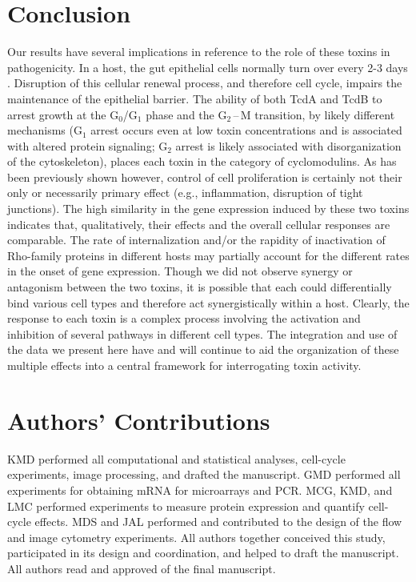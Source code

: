 \section{Conclusion}
Our results have several implications in reference to the role of these toxins in pathogenicity. In a host, the gut epithelial cells normally turn over every 2-3 days \cite{Kim:2010ja}. Disruption of this cellular renewal process, and therefore cell cycle, impairs the maintenance of the epithelial barrier. The ability of both TcdA and TcdB to arrest growth at the G$_{\text{0}}$/G$_{\text{1}}$ phase and the G$_{\text{2}}$\,--\,M transition, by likely different mechanisms (G$_{\text{1}}$ arrest occurs even at low toxin concentrations and is associated with altered protein signaling; G$_{\text{2}}$ arrest is likely associated with disorganization of the cytoskeleton), places each toxin in the category of cyclomodulins. As has been previously shown however, control of cell proliferation is certainly not their only or necessarily primary effect (e.g., inflammation, disruption of tight junctions). The high similarity in the gene expression induced by these two toxins indicates that, qualitatively, their effects and the overall cellular responses are comparable. The rate of internalization and/or the rapidity of inactivation of Rho-family proteins in different hosts may partially account for the different rates in the onset of gene expression. Though we did not observe synergy or antagonism between the two toxins, it is possible that each could differentially bind various cell types and therefore act synergistically within a host. Clearly, the response to each toxin is a complex process involving the activation and inhibition of several pathways in different cell types. The integration and use of the data we present here have and will continue to aid the organization of these multiple effects into a central framework for interrogating toxin activity.

\section{Authors' Contributions}
KMD performed all computational and statistical analyses, cell-cycle experiments, image processing, and drafted the manuscript. GMD performed all experiments for obtaining mRNA for microarrays and PCR. MCG, KMD, and LMC performed experiments to measure protein expression and quantify cell-cycle effects. MDS and JAL performed and contributed to the design of the flow and image cytometry experiments. All authors together conceived this study, participated in its design and coordination, and helped to draft the manuscript. All authors read and approved of the final manuscript.

